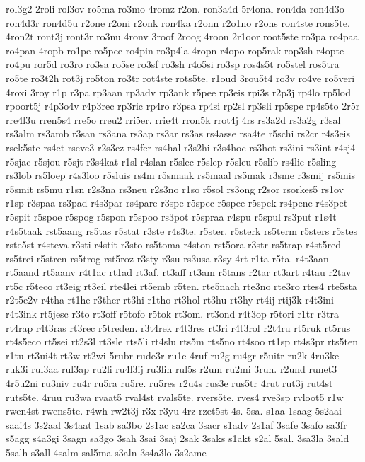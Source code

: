 {rol3g2
2roli
rol3ov
ro5ma
ro3mo
4romz
r2on.
ron3a4d
5r4onal
ron4da
ron4d3o
ron4d3r
ron4d5u
r2one
r2oni
r2onk
ron4ka
r2onn
r2o1no
r2ons
ron4ste
rons5te.
4ron2t
ront3j
ront3r
ro3nu
4ronv
3roof
2roog
4roon
2r1oor
root5ste
ro3pa
ro4paa
ro4pan
4ropb
ro1pe
ro5pee
ro4pin
ro3p4la
4ropn
r4opo
rop5rak
rop3sh
r4opte
ro4pu
ror5d
ro3ro
ro3sa
ro5se
ro3sf
ro3sh
r4o5si
ro3sp
ros4s5t
ro5stel
ros5tra
ro5te
ro3t2h
rot3j
ro5ton
ro3tr
rot4ste
rots5te.
r1oud
3rou5t4
ro3v
ro4ve
ro5veri
4roxi
3roy
r1p
r3pa
rp3aan
rp3adv
rp3ank
r5pee
rp3eis
rpi3s
r2p3j
rp4lo
rp5lod
rpoort5j
r4p3o4v
r4p3rec
rp3ric
rp4ro
r3psa
rp4si
rp2sl
rp3sli
rp5spe
rp4s5to
2r5r
rre4l3u
rren5s4
rre5o
rreu2
rri5er.
rrie4t
rron5k
rrot4j
4rs
rs3a2d
rs3a2g
r3sal
rs3alm
rs3amb
r3san
rs3ana
rs3ap
rs3ar
rs3as
rs4asse
rsa4te
r5schi
rs2cr
r4s3eis
rsek5ste
rs4et
rseve3
r2s3ez
rs4fer
rs4hal
r3s2hi
r3s4hoc
rs3hot
rs3ini
rs3int
r4sj4
r5sjac
r5sjou
r5sjt
r3s4kat
r1sl
r4slan
r5slec
r5slep
r5sleu
r5slib
rs4lie
r5sling
rs3lob
rs5loep
r4s3loo
r5sluis
rs4m
r5smaak
rs5maal
rs5mak
r3sme
r3smij
rs5mis
r5smit
rs5mu
r1sn
r2s3na
rs3neu
r2s3no
r1so
r5sol
rs3ong
r2sor
rsorkes5
rs1ov
r1sp
r3spaa
rs3pad
r4s3par
rs4pare
r3spe
r5spec
r5spee
r5spek
rs4pene
r4s3pet
r5spit
r5spoe
r5spog
r5spon
r5spoo
rs3pot
r5spraa
r4spu
r5spul
rs3put
r1s4t
r4s5taak
rst5aang
rs5tas
r5stat
r3ste
r4s3te.
r5ster.
r5sterk
rs5term
r5sters
r5stes
rste5st
r4steva
r3sti
r4stit
r3sto
rs5toma
r4ston
rst5ora
r3str
rs5trap
r4st5red
rs5trei
r5stren
rs5trog
rst5roz
r3sty
r3su
rs3usa
r3sy
4rt
r1ta
r5ta.
r4t3aan
rt5aand
rt5aanv
r4t1ac
rt1ad
rt3af.
rt3aff
rt3am
r5tans
r2tar
rt3art
r4tau
r2tav
rt5c
r5teco
rt3eig
rt3eil
rte4lei
rt5emb
r5ten.
rte5nach
rte3no
rte3ro
rtes4
rte5sta
r2t5e2v
r4tha
rt1he
r3ther
rt3hi
r1tho
rt3hol
rt3hu
rt3hy
rt4ij
rtij3k
r4t3ini
r4t3ink
rt5jesc
r3to
rt3off
r5tofo
r5tok
rt3om.
rt3ond
r4t3op
r5tori
r1tr
r3tra
rt4rap
r4t3ras
rt3rec
r5treden.
r3t4rek
r4t3res
rt3ri
r4t3rol
r2t4ru
rt5ruk
rt5rus
rt4s5eco
rt5sei
rt2s3l
rt3sle
rts5li
rt4slu
rts5m
rts5no
rt4soo
rt1sp
rt4s3pr
rts5ten
r1tu
rt3ui4t
rt3w
rt2wi
5rubr
rude3r
ru1e
4ruf
ru2g
ru4gr
r5uitr
ru2k
4ru3ke
ruk3i
rul3aa
rul3ap
ru2li
ru4l3ij
ru3lin
rul5s
r2um
ru2mi
3run.
r2und
runet3
4r5u2ni
ru3niv
ru4r
ru5ra
ru5re.
ru5res
r2u4s
rus3e
rus5tr
4rut
rut3j
rut4st
ruts5te.
4ruu
ru3wa
rvaat5
rval4st
rvals5te.
rvers5te.
rves4
rve3sp
rvloot5
r1w
rwen4st
rwens5te.
r4wh
rw2t3j
r3x
r3yu
4rz
rzet5st
4s.
5sa.
s1aa
1saag
5s2aai
saai4s
3s2aal
3s4aat
1sab
sa3bo
2s1ac
sa2ca
3sacr
s1adv
2s1af
3safe
3safo
sa3fr
s5agg
s4a3gi
3sagn
sa3go
3sah
3sai
3saj
2sak
3saks
s1akt
s2al
5sal.
3sa3la
3sald
5salh
s3all
4salm
sal5ma
s3aln
3s4a3lo
3s2ame
}
